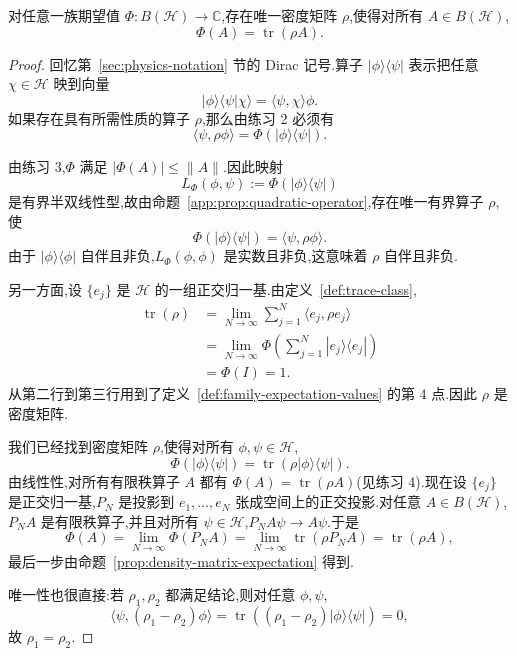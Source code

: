 \begin{theorem}[期望值族的密度矩阵刻画]\label{thm:density-matrix-characterization}
对任意一族期望值 $\Phi:B(\mathcal H)\to\mathbb C$,存在唯一密度矩阵 $\rho$,使得对所有 $A\in B(\mathcal H)$,
\[
 \Phi(A)=\operatorname{tr}(\rho A).
\]
\end{theorem}

\begin{proof}
回忆第~\ref{sec:physics-notation} 节的 Dirac 记号.算子 $|\phi\rangle\langle\psi|$ 表示把任意 $\chi\in\mathcal H$ 映到向量
\[
 |\phi\rangle\langle\psi|\chi\rangle
 =\langle\psi,\chi\rangle\phi.
\]
如果存在具有所需性质的算子 $\rho$,那么由练习 2 必须有
\[
 \langle\psi,\rho\phi\rangle
 =\Phi(|\phi\rangle\langle\psi|).
\]

由练习 3,$\Phi$ 满足 $|\Phi(A)|\le\|A\|$.因此映射
\[
 L_\Phi(\phi,\psi):=\Phi(|\phi\rangle\langle\psi|)
\]
是有界半双线性型,故由命题~\ref{app:prop:quadratic-operator},存在唯一有界算子 $\rho$,使
\[
 \Phi(|\phi\rangle\langle\psi|)
 =\langle\psi,\rho\phi\rangle.
\]
由于 $|\phi\rangle\langle\phi|$ 自伴且非负,$L_\Phi(\phi,\phi)$ 是实数且非负,这意味着 $\rho$ 自伴且非负.

另一方面,设 $\{e_j\}$ 是 $\mathcal H$ 的一组正交归一基.由定义~\ref{def:trace-class},
\[
\begin{aligned}
 \operatorname{tr}(\rho)
 &=\lim_{N\to\infty}\sum_{j=1}^N\langle e_j,\rho e_j\rangle\\
 &=\lim_{N\to\infty}\Phi\!\left(\sum_{j=1}^N|e_j\rangle\langle e_j|\right)\\
 &=\Phi(I)=1.
\end{aligned}
\]
从第二行到第三行用到了定义~\ref{def:family-expectation-values} 的第 4 点.因此 $\rho$ 是密度矩阵.

我们已经找到密度矩阵 $\rho$,使得对所有 $\phi,\psi\in\mathcal H$,
\[
 \Phi(|\phi\rangle\langle\psi|)
 =\operatorname{tr}(\rho|\phi\rangle\langle\psi|).
\]
由线性性,对所有有限秩算子 $A$ 都有 $\Phi(A)=\operatorname{tr}(\rho A)$(见练习 4).现在设 $\{e_j\}$ 是正交归一基,$P_N$ 是投影到 $e_1,\ldots,e_N$ 张成空间上的正交投影.对任意 $A\in B(\mathcal H)$,$P_NA$ 是有限秩算子,并且对所有 $\psi\in\mathcal H$,$P_NA\psi\to A\psi$.于是
\[
 \Phi(A)=\lim_{N\to\infty}\Phi(P_NA)
 =\lim_{N\to\infty}\operatorname{tr}(\rho P_NA)
 =\operatorname{tr}(\rho A),
\]
最后一步由命题~\ref{prop:density-matrix-expectation} 得到.

唯一性也很直接:若 $\rho_1,\rho_2$ 都满足结论,则对任意 $\phi,\psi$,
\[
 \langle\psi,(\rho_1-\rho_2)\phi\rangle
 =\operatorname{tr}((\rho_1-\rho_2)|\phi\rangle\langle\psi|)=0,
\]
故 $\rho_1=\rho_2$.
\end{proof}

